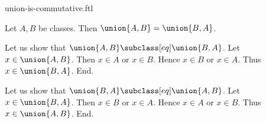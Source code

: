 \documentclass{article}
\begin{document}
\begin{smodule}[creators={Marcel Schütz}]{union-is-commutative.ftl}

  \begin{fproposition*}[label=5874937237602304]
    Let $A, B$ be classes.
    Then $\union{A,B} = \union{B,A}$.
  \end{fproposition*}
  \begin{fproof}
    Let us show that $\union{A,B} \subclass[eq] \union{B,A}$.
      Let $x \in \union{A,B}$.
      Then $x \in A$ or $x \in B$.
      Hence $x \in B$ or $x \in A$.
      Thus $x \in \union{B,A}$.
    End.

    Let us show that $\union{B,A} \subclass[eq] \union{A,B}$.
      Let $x \in \union{B,A}$.
      Then $x \in B$ or $x \in A$.
      Hence $x \in A$ or $x \in B$.
      Thus $x \in \union{A,B}$.
    End.
  \end{fproof}
\end{smodule}
\end{document}
